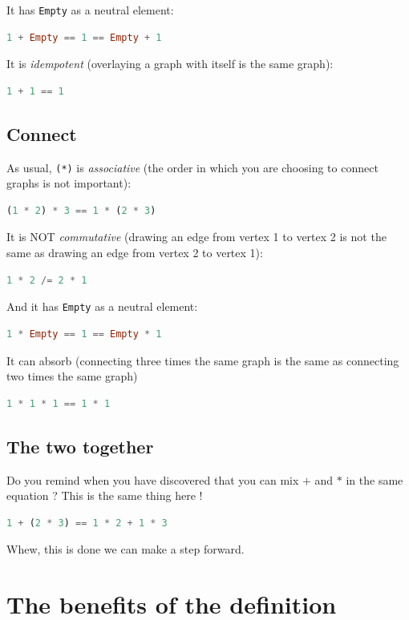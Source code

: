\documentclass[10pt,a4paper]{article}
\begin{document}
It has \verb|Empty| as a neutral element:
\begin{lstlisting}[language=Haskell, frame=single]
1 + Empty == 1 == Empty + 1
\end{lstlisting}

It is \emph{idempotent} (overlaying a graph with itself is the same graph):
\begin{lstlisting}[language=Haskell, frame=single]
1 + 1 == 1
\end{lstlisting}

\subsection{Connect}
As usual, \verb|(*)| is \emph{associative} (the order in which you are choosing to connect graphs is not important):
\begin{lstlisting}[language=Haskell, frame=single]
(1 * 2) * 3 == 1 * (2 * 3)
\end{lstlisting}

It is NOT \emph{commutative} (drawing an edge from vertex 1 to vertex 2 is not the same as drawing an edge from vertex 2 to vertex 1):
\begin{lstlisting}[language=Haskell, frame=single]
1 * 2 /= 2 * 1
\end{lstlisting}

And it has \verb|Empty| as a neutral element:
\begin{lstlisting}[language=Haskell, frame=single]
1 * Empty == 1 == Empty * 1
\end{lstlisting}

It can absorb (connecting three times the same graph is the same as connecting two times the same graph)
\begin{lstlisting}[language=Haskell, frame=single]
1 * 1 * 1 == 1 * 1
\end{lstlisting}

\subsection{The two together}
Do you remind when you have discovered that you can mix $+$ and $*$ in the same equation ? This is the same thing here !
\begin{lstlisting}[language=Haskell, frame=single]
1 + (2 * 3) == 1 * 2 + 1 * 3
\end{lstlisting}

Whew, this is done we can  make a step forward.

\section{The benefits of the definition}
\end{document}
